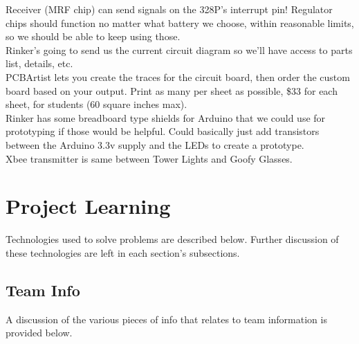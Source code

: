 \documentclass[12pt]{article}
\begin{document}
	\noindent
	Receiver (MRF chip) can send signals on the 328P’s interrupt pin! Regulator chips should function no 		matter what battery we choose, within reasonable limits, so we should be able to keep using those.\\ 
	
	\noindent	
	Rinker’s going to send us the current circuit diagram so we’ll have access to parts list, details, etc.\\ 
	
	\noindent
	PCBArtist lets you create the traces for the circuit board, then order the custom board based on your 		output. Print as many per sheet as possible, \$33 for each sheet, for students (60 square inches max).\\
	
	\noindent
	Rinker has some breadboard type shields for Arduino that we could use for prototyping if those would be 	helpful. Could basically just add transistors between the Arduino 3.3v supply and the LEDs to create a 		prototype.\\
	 
	\noindent	
	Xbee transmitter is same between Tower Lights and Goofy Glasses.\\ 	

	\clearpage

\section{Project Learning}
	Technologies used to solve problems are described below. Further discussion of these technologies are left in each section's subsections.

	\subsection{Team Info}
	 A discussion of the various pieces of info that relates to team information is provided below.
	
\end{document}

